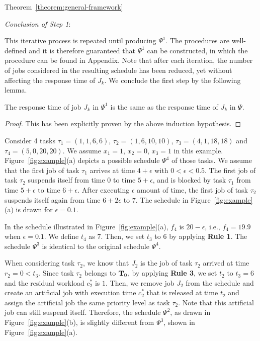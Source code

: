 \begin{appProof}{Theorem~\ref{theorem:general-framework}}
 
\noindent\textit{Conclusion of Step 1}:

This iterative process is repeated until producing $\Psi^1$. The procedures are well-defined and it is therefore guaranteed that $\Psi^1$ can be constructed, in which the procedure can be found in Appendix\citetechreport{}.  Note that after each iteration, the number of jobs considered in the resulting schedule has been reduced, yet without affecting the response time of $J_k$. We conclude the first step by the following lemma.

 \begin{Lemma}
\label{lem:step-1-conclusion}
 The response time of job $J_k$ in $\Psi^1$ is the same as the response time of $J_k$ in $\Psi$.
\end{Lemma}
\begin{proof}
  This has been explicitly proven by the above induction hypothesis.
\end{proof}


\begin{example}
\label{ex:proof_step1}
Consider 4 tasks $\tau_1 =(1,1,6,6)$, $\tau_2 =(1,6,10,10)$, $\tau_3 =(4,1,18,18)$ and $\tau_4 =(5,0,20,20)$.
We assume  $x_1=1$, $x_2=0$, $x_3=1$ in this example.
Figure~\ref{fig:example}(a) depicts a possible schedule $\Psi^4$ of those tasks. We assume that the first job of task $\tau_1$ arrives
at time $4+\epsilon$ with $0 < \epsilon < 0.5$. The first job
of task $\tau_2$ suspends itself from time $0$ to time $5+\epsilon$,
and is blocked by task $\tau_1$ from time $5+\epsilon$ to time
$6+\epsilon$. After executing $\epsilon$ amount
of time, the first job of task $\tau_2$ suspends itself again from
time $6+2\epsilon$ to $7$. The schedule in Figure~\ref{fig:example}(a) is drawn for $\epsilon=0.1$.
   
In the schedule illustrated in Figure~\ref{fig:example}(a), $f_4$ is
$20-\epsilon$, i.e., $f_4=19.9$ when $\epsilon=0.1$.  We define $t_4$
as $7$. Then, we set $t_3$ to $6$ by applying {\bf Rule 1}. The
schedule $\Psi^3$ is identical to the original schedule $\Psi^4$.

When considering task $\tau_2$, we know that $J_2$ is the job of task
$\tau_2$ arrived at time $r_2=0 < t_3$. Since task $\tau_2$ belongs to ${\bf
  T}_0$, by applying {\bf Rule 3}, we set $t_2$ to $t_3=6$ and the
residual workload $c_2^*$ is $1$. Then, we remove job $J_2$ from the
schedule and create an artificial job with execution time $c_2^*$ that
is released at time $t_2$ and assign the artificial job the same priority level as task
$\tau_2$. Note that this artificial job can still suspend itself. Therefore, the schedule $\Psi^2$, as drawn in 
Figure~\ref{fig:example}(b), is slightly different from $\Psi^3$, shown in Figure~\ref{fig:example}(a).


\end{example}
\end{appProof}
